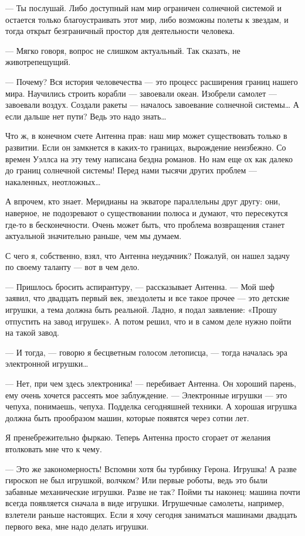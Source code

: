 — Ты  послушай. Либо  доступный  нам мир  ограничен солнечной  системой  и
остается только благоустраивать этот мир, либо возможны полеты к  звездам,
и тогда открыт безграничный простор для деятельности человека.

—  Мягко  говоря,   вопрос  не   слишком  актуальный.   Так  сказать,   не
животрепещущий.

— Почему? Вся история человечества — это процесс расширения границ  нашего
мира. Научились  строить корабли  — завоевали  океан. Изобрели  самолет  —
завоевали воздух. Создали ракеты — началось завоевание солнечной  системы…
А если дальше нет пути? Ведь это надо знать…

Что ж, в конечном счете Антенна прав: наш мир может существовать только  в
развитии. Если он замкнется в каких-то границах, вырождение неизбежно.  Со
времен Уэллса  на эту  тему написана  бездна романов.  Но нам  еще ох  как
далеко до границ  солнечной системы!  Перед нами тысячи  других проблем  —
накаленных, неотложных…

А впрочем, кто знает. Меридианы  на экваторе параллельны друг другу:  они,
наверное, не подозревают о существовании полюса и думают, что  пересекутся
где-то в бесконечности. Очень может быть, что проблема возвращения  станет
актуальной значительно раньше, чем мы думаем.

С чего  я, собственно,  взял,  что Антенна  неудачник? Пожалуй,  он  нашел
задачу по своему таланту — вот в чем дело.

— Пришлось бросить аспирантуру, — рассказывает Антенна. — Мой шеф  заявил,
что двадцать  первый век,  звездолеты и  все такое  прочее —  это  детские
игрушки, а тема  должна быть  реальной. Ладно, я  подал заявление:  «Прошу
отпустить на завод игрушек». А потом решил, что и в самом деле нужно пойти
на такой завод.

— И тогда, — говорю я  бесцветным голосом летописца, — тогда началась  эра
электронной игрушки…

— Нет, при чем здесь электроника! — перебивает Антенна. Он хороший парень,
ему очень хочется рассеять  мое заблуждение. —  Электронные игрушки —  это
чепуха, понимаешь, чепуха. Подделка сегодняшней техники. А хорошая игрушка
должна быть прообразом машин, которые появятся через сотни лет.

Я пренебрежительно  фыркаю.  Теперь  Антенна  просто  сгорает  от  желания
втолковать мне что к чему.

— Это же закономерность! Вспомни хотя бы турбинку Герона. Игрушка! А разве
гироскоп не  был  игрушкой, волчком?  Или  первые роботы,  ведь  это  были
забавные механические  игрушки. Разве  не так?  Пойми ты  наконец:  машина
почти всегда  появляется  сначала  в виде  игрушки.  Игрушечные  самолеты,
например, взлетели  раньше  настоящих.  Если  я  хочу  сегодня  заниматься
машинами двадцать первого века, мне надо делать игрушки.

